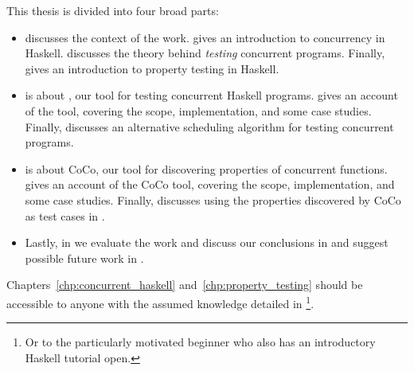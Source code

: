 This thesis is divided into four broad parts:

\begin{itemize}
\item {} discusses the context of the work.
   gives an introduction to concurrency in Haskell.
   discusses the theory behind \emph{testing} concurrent programs.
  Finally,  gives an introduction to property testing
  in Haskell.

\item {} is about \dejafu{}, our tool for testing concurrent
  Haskell programs.   gives an account of the \dejafu{} tool,
  covering the scope, implementation, and some case studies.  Finally,
   discusses an alternative scheduling algorithm for testing
  concurrent programs.

\item {} is about CoCo, our tool for discovering properties of
  concurrent functions.   gives an account of the CoCo tool,
  covering the scope, implementation, and some case studies.  Finally,
   discusses using the properties discovered by CoCo as
  test cases in \dejafu{}.

\item Lastly, in  we evaluate the work and discuss our conclusions
  in  and suggest possible future work in
  .
\end{itemize}

Chapters~\ref{chp:concurrent_haskell} and~\ref{chp:property_testing} should be
accessible to anyone with the assumed knowledge detailed in
\footnote{Or to the particularly motivated beginner who also has
  an introductory Haskell tutorial open.}.
